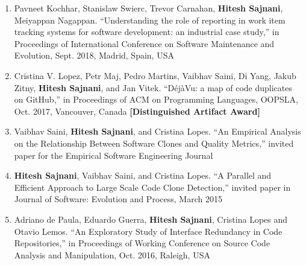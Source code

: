 \documentclass[letterpaper,11pt]{article}
\begin{document}
\begin{enumerate}

 \vspace{-1pt}\item\small{Pavneet Kochhar, Stanislaw Swierc, Trevor Carnahan, \textbf{Hitesh Sajnani}, Meiyappan Nagappan. “Understanding the role of reporting in work item tracking systems for software development: an industrial case study,” in Proceedings of International Conference on Software Maintenance and Evolution, Sept. 2018, Madrid, Spain, USA  }

 \vspace{-1pt}\item\small{Cristina V. Lopez, Petr Maj, Pedro Martins, Vaibhav Saini, Di Yang, Jakub Zitny, \textbf{Hitesh Sajnani}, and Jan Vitek. “DéjàVu: a map of code duplicates on GitHub,” in Proceedings of ACM on Programming Languages, OOPSLA, Oct. 2017, Vancouver, Canada \textbf{[Distinguished Artifact Award]}  }

 \vspace{-1pt}\item\small{Vaibhav Saini, \textbf{Hitesh Sajnani}, and Cristina Lopes. “An Empirical Analysis on the
Relationship Between Software Clones and Quality Metrics,” invited paper for the
Empirical Software Engineering Journal  }

 \vspace{-1pt}\item\small{\textbf{Hitesh Sajnani}, Vaibhav Saini, and Cristina Lopes. “A Parallel and Efficient Approach
to Large Scale Code Clone Detection,” invited paper in Journal of Software: Evolution
and Process, March 2015}


 \vspace{-1pt}\item\small{Adriano de Paula, Eduardo Guerra, \textbf{Hitesh Sajnani}, Cristina Lopes and Otavio Lemos. “An Exploratory Study of Interface Redundancy in Code Repositories,” in Proceedings of Working Conference on Source Code Analysis and Manipulation, Oct. 2016, Raleigh, USA  }


\end{enumerate}
\end{document}
